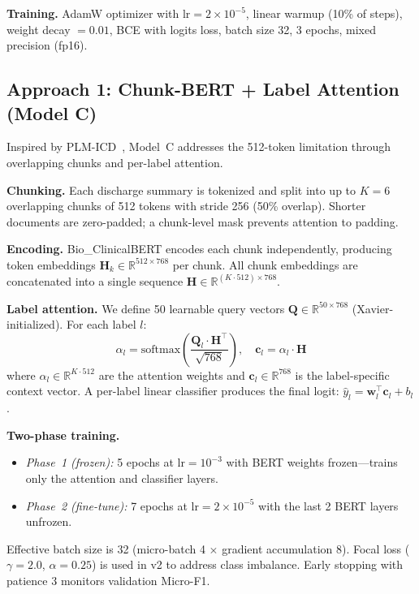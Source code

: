 \documentclass[11pt,a4paper]{article}
\begin{document}
\textbf{Training.} AdamW optimizer with $\text{lr} = 2 \times 10^{-5}$, linear warmup (10\% of steps), weight decay $= 0.01$, BCE with logits loss, batch size 32, 3 epochs, mixed precision (fp16).

\subsection{Approach 1: Chunk-BERT + Label Attention (Model C)}
\label{sec:model_c}

Inspired by PLM-ICD~\cite{huang2022plmicd}, Model~C addresses the 512-token limitation through overlapping chunks and per-label attention.

\textbf{Chunking.} Each discharge summary is tokenized and split into up to $K = 6$ overlapping chunks of 512 tokens with stride 256 (50\% overlap). Shorter documents are zero-padded; a chunk-level mask prevents attention to padding.

\textbf{Encoding.} Bio\_ClinicalBERT encodes each chunk independently, producing token embeddings $\mathbf{H}_k \in \mathbb{R}^{512 \times 768}$ per chunk. All chunk embeddings are concatenated into a single sequence $\mathbf{H} \in \mathbb{R}^{(K \cdot 512) \times 768}$.

\textbf{Label attention.} We define 50 learnable query vectors $\mathbf{Q} \in \mathbb{R}^{50 \times 768}$ (Xavier-initialized). For each label $l$:
\begin{equation}
    \alpha_l = \text{softmax}\left(\frac{\mathbf{Q}_l \cdot \mathbf{H}^\top}{\sqrt{768}}\right), \quad \mathbf{c}_l = \alpha_l \cdot \mathbf{H}
\end{equation}
where $\alpha_l \in \mathbb{R}^{K \cdot 512}$ are the attention weights and $\mathbf{c}_l \in \mathbb{R}^{768}$ is the label-specific context vector. A per-label linear classifier produces the final logit: $\hat{y}_l = \mathbf{w}_l^\top \mathbf{c}_l + b_l$.

\textbf{Two-phase training.}
\begin{itemize}[nosep,leftmargin=1.5em]
    \item \textit{Phase~1 (frozen):} 5 epochs at $\text{lr} = 10^{-3}$ with BERT weights frozen---trains only the attention and classifier layers.
    \item \textit{Phase~2 (fine-tune):} 7 epochs at $\text{lr} = 2 \times 10^{-5}$ with the last 2 BERT layers unfrozen.
\end{itemize}
Effective batch size is 32 (micro-batch 4 $\times$ gradient accumulation 8). Focal loss ($\gamma = 2.0$, $\alpha = 0.25$) is used in v2 to address class imbalance. Early stopping with patience 3 monitors validation Micro-F1.
\end{document}
